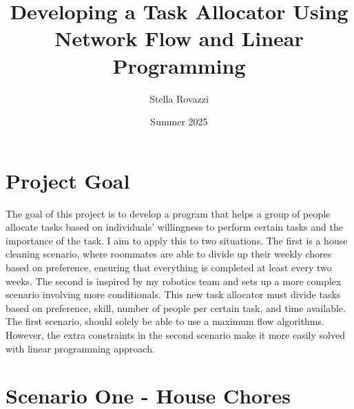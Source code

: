 \documentclass{article}
\title{Developing a Task Allocator Using Network Flow and Linear Programming}
\author{Stella Rovazzi}
\date{Summer 2025}
\newcommand\tab[1][1cm]{\hspace*{#1}}
\begin{document}
\maketitle

\section*{Project Goal}
\tab The goal of this project is to develop a program that helps a group of people allocate tasks based on individuals' willingness to perform certain tasks and 
the importance of the task. I aim to apply this to two situations. The first is a house cleaning scenario, where roommates are able to divide up their weekly chores based on preference, ensuring
that everything is completed at least every two weeks. The second is inspired by my robotics team and sets up a more complex scenario involving more conditionals. This new task allocator must divide
tasks based on preference, skill, number of people per certain task, and time available. The first scenario, should solely be able to use a maximum flow algorithms. However, the extra constraints
 in the second scenario make it more easily solved with linear programming approach.

\section*{Scenario One - House Chores}
\end{document}
